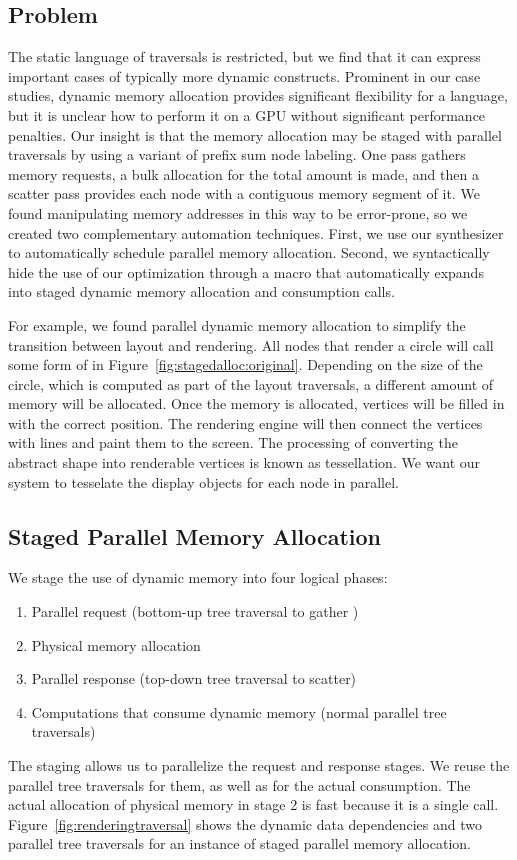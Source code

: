 \subsection{Problem}
The static language of traversals is restricted, but we find that it can express important cases of typically more dynamic constructs. Prominent in our case studies, dynamic memory allocation provides significant flexibility for a language, but it is unclear how to perform it on a GPU without significant performance penalties. Our insight is that the memory allocation may be staged with parallel traversals by using a variant of prefix sum node labeling. One pass gathers  memory requests, a bulk allocation for the total amount is made, and then a scatter pass provides each node with a contiguous memory segment of it. We found manipulating memory addresses in this way to be error-prone, so we created two complementary automation techniques. First, we use our synthesizer to automatically schedule parallel memory allocation. Second, we syntactically hide the use of our optimization through a macro that automatically expands into staged dynamic memory allocation and consumption calls.

For example, we found parallel dynamic memory allocation to simplify the transition between layout and rendering. All nodes that render a circle will call some form of  in Figure~\ref{fig:stagedalloc:original}. Depending on the size of the circle, which is computed as part of the layout traversals, a different amount of memory will be allocated. Once the memory is allocated, vertices will be filled in with the correct position. The rendering engine will then connect the vertices with lines and paint them to the screen. The processing of converting the abstract shape into renderable vertices is known as tessellation. We want our system to tesselate the display objects for each node in parallel.




\subsection{Staged Parallel Memory Allocation}
We stage the use of dynamic memory into four logical phases: 
\begin{enumerate}
\item Parallel request (bottom-up tree traversal to gather )
\item Physical memory allocation
\item Parallel response (top-down tree traversal to scatter)
\item Computations that consume dynamic memory (normal parallel tree traversals)
\end{enumerate}
 The staging allows us to parallelize the request and response stages. We reuse the parallel tree traversals for them, as well as for the actual consumption. The actual allocation of physical memory in stage 2 is fast because it is a single call. Figure~\ref{fig:renderingtraversal} shows the dynamic data dependencies and two parallel tree traversals for an instance of staged parallel memory allocation.

